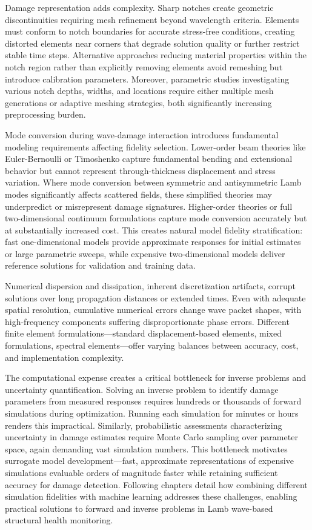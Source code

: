 \documentclass[12pt,a4paper]{report}
\begin{document}
Damage representation adds complexity. Sharp notches create geometric discontinuities requiring mesh refinement beyond wavelength criteria. Elements must conform to notch boundaries for accurate stress-free conditions, creating distorted elements near corners that degrade solution quality or further restrict stable time steps. Alternative approaches reducing material properties within the notch region rather than explicitly removing elements avoid remeshing but introduce calibration parameters. Moreover, parametric studies investigating various notch depths, widths, and locations require either multiple mesh generations or adaptive meshing strategies, both significantly increasing preprocessing burden.

Mode conversion during wave-damage interaction introduces fundamental modeling requirements affecting fidelity selection. Lower-order beam theories like Euler-Bernoulli or Timoshenko capture fundamental bending and extensional behavior but cannot represent through-thickness displacement and stress variation. Where mode conversion between symmetric and antisymmetric Lamb modes significantly affects scattered fields, these simplified theories may underpredict or misrepresent damage signatures. Higher-order theories or full two-dimensional continuum formulations capture mode conversion accurately but at substantially increased cost. This creates natural model fidelity stratification: fast one-dimensional models provide approximate responses for initial estimates or large parametric sweeps, while expensive two-dimensional models deliver reference solutions for validation and training data.

Numerical dispersion and dissipation, inherent discretization artifacts, corrupt solutions over long propagation distances or extended times. Even with adequate spatial resolution, cumulative numerical errors change wave packet shapes, with high-frequency components suffering disproportionate phase errors. Different finite element formulations—standard displacement-based elements, mixed formulations, spectral elements—offer varying balances between accuracy, cost, and implementation complexity.

The computational expense creates a critical bottleneck for inverse problems and uncertainty quantification. Solving an inverse problem to identify damage parameters from measured responses requires hundreds or thousands of forward simulations during optimization. Running each simulation for minutes or hours renders this impractical. Similarly, probabilistic assessments characterizing uncertainty in damage estimates require Monte Carlo sampling over parameter space, again demanding vast simulation numbers. This bottleneck motivates surrogate model development—fast, approximate representations of expensive simulations evaluable orders of magnitude faster while retaining sufficient accuracy for damage detection. Following chapters detail how combining different simulation fidelities with machine learning addresses these challenges, enabling practical solutions to forward and inverse problems in Lamb wave-based structural health monitoring.







 
\end{document}
